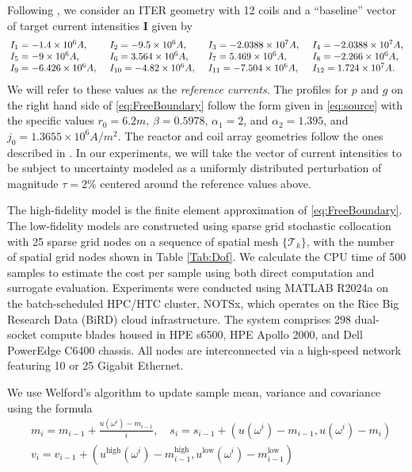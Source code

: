 \documentclass[final,3p,times,11pt]{elsarticle}
\begin{document}
Following \cite{FaHe:2017}, we consider an ITER geometry with 12 coils and a ``baseline'' vector of target current intensities $\boldsymbol{I}$ given by
\begin{equation}\label{eq:CentralCurrentValue}
{\renewcommand{\arraycolsep}{2pt}
\begin{array}{llll}
I_1 = -1.4 \times 10^{6} A, \quad & I_2 = -9.5 \times 10^{6} A, \quad & I_3 = -2.0388 \times 10^{7} A, \quad & I_4 = -2.0388 \times 10^{7} A, \\
I_5 = -9 \times 10^{6} A, \quad & I_6 = 3.564 \times 10^{6} A, \quad & I_7 = 5.469 \times 10^{6} A, \quad & I_8 = -2.266 \times 10^{6} A, \\
I_9 = -6.426 \times 10^{6} A, \quad & I_{10} = -4.82 \times 10^{6} A, \quad & I_{11} = -7.504 \times 10^{6} A, \quad & I_{12} = 1.724 \times 10^{7} A. 
\end{array}
}
\end{equation}
%
We will refer to these values as the \textit{reference currents}. The  profiles for $p$ and $g$ on the right hand side of \eqref{eq:FreeBoundary} follow the form given in \eqref{eq:source} with the specific values $r_0=6.2m,\,\beta=0.5978, \, \alpha_1 = 2$, and $\alpha_2=1.395$, and $j_0=1.3655 \times 10^6 A/m^2$. The reactor and coil array geometries follow the ones described in \cite{Amoskov2009}. In our experiments, we will take the vector of current intensities to be subject to uncertainty modeled as a uniformly distributed perturbation of magnitude $\tau=2\%$ centered around the reference values above.


The high-fidelity model is the finite element approximation of \eqref{eq:FreeBoundary}. The low-fidelity models are constructed using sparse grid stochastic collocation with 25 sparse grid nodes on a sequence of spatial mesh $\{\mathcal{T}_k\}$, with the number of spatial grid nodes shown in Table \ref{Tab:Dof}. We calculate the CPU time of 500 samples to estimate the cost per sample using both direct computation and surrogate evaluation.
Experiments were conducted using MATLAB R2024a on the batch-scheduled HPC/HTC cluster, NOTSx, which operates on the Rice Big Research Data (BiRD) cloud infrastructure. The system comprises 298 dual-socket compute blades housed in HPE s6500, HPE Apollo 2000, and Dell PowerEdge C6400 chassis. All nodes are interconnected via a high-speed network featuring 10 or 25 Gigabit Ethernet.

We use Welford's algorithm to update sample mean, variance and covariance using the formula
\begin{align*}
    &m_i = m_{i-1} + \frac{u(\omega^i)-m_{i-1}}{i},\quad s_i = s_{i-1} + \left(u(\omega^i)-m_{i-1}, u(\omega^i)-m_{i}\right)\\
    &v_i = v_{i-1} + \left(u^{\text{high}}(\omega^i)-m^{\text{high}}_{i-1},u^{\text{low}}(\omega^i)-m^{\text{low}}_{i-1}\right)
\end{align*}
\end{document}

